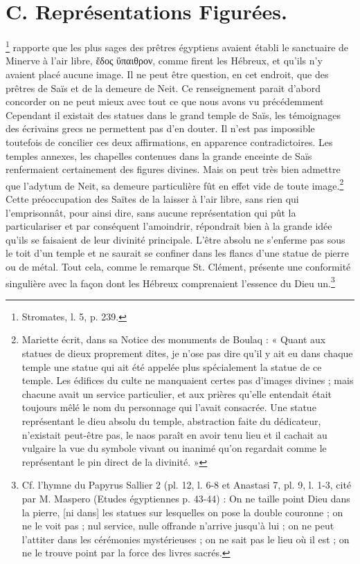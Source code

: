 \documentclass[letterpaper,twocolumn,openany,nodeprecatedcode]{dndbook}
\begin{document}
\section{C. Représentations Figurées.}
\footnote{Stromates, l. 5, p. 239.} rapporte que les plus sages des prêtres égyptiens avaient établi le sanctuaire de Minerve à l'air libre, ἔδος ὕπαιθρον, comme firent les Hébreux, et qu'ils n'y avaient placé aucune image. Il ne peut être question, en cet endroit, que des prêtres de Saïs et de la demeure de Neit. Ce renseignement parait d'abord concorder on ne peut mieux avec tout ce que nous avons vu précédemment Cependant il existait des statues dans le grand temple de Saïs, les témoignages des écrivains grecs ne permettent pas d'en douter. Il n'est pas impossible toutefois de concilier ces deux affirmations, en apparence contradictoires. Les temples annexes, les chapelles contenues dans la grande enceinte de Saïs renfermaient certainement des figures divines. Mais on peut très bien admettre que l'adytum de Neit, sa demeure particulière fût en effet vide de toute image.\footnote{Mariette écrit, dans sa Notice des monuments de Boulaq : « Quant aux statues de dieux proprement dites, je n'ose pas dire qu'il y ait eu dans chaque temple une statue qui ait été appelée plus spécialement la statue de ce temple. Les édifices du culte ne manquaient certes pas d'images divines ; mais chacune avait un service particulier, et aux prières qu'elle entendait était toujours mêlé le nom du personnage qui l'avait consacrée. Une statue représentant le dieu absolu du temple, abstraction faite du dédicateur, n'existait peut-être pas, le naos paraît en avoir tenu lieu et il cachait au vulgaire la vue du symbole vivant ou inanimé qu'on regardait comme le représentant le pin direct de la divinité. »} Cette préoccupation des Saïtes de la laisser à l'air libre, sans rien qui l'emprisonnât, pour ainsi dire, sans aucune représentation qui pût la particulariser et par conséquent l'amoindrir, répondrait bien à la grande idée qu'ils se faisaient de leur divinité principale. L'être absolu ne s'enferme pas sous le toit d'un temple et ne saurait se confiner dans les flancs d'une statue de pierre ou de métal. Tout cela, comme le remarque St. Clément, présente une conformité singulière avec la façon dont les Hébreux comprenaient l'essence du Dieu un.\footnote{Cf. l'hymne du Papyrus Sallier 2 (pl. 12, l. 6-8 et Anastasi 7, pl. 9, l. 1-3, cité par M. Maspero (Etudes égyptiennes p. 43-44) : On ne taille point Dieu dans la pierre, [ni dans] les statues sur lesquelles on pose la double couronne ; on ne le voit pas ; nul service, nulle offrande n'arrive jusqu'à lui ; on ne peut l'attiter dans les cérémonies mystérieuses ; on ne sait pas le lieu où il est ; on ne le trouve point par la force des livres sacrés.}
\end{document}
